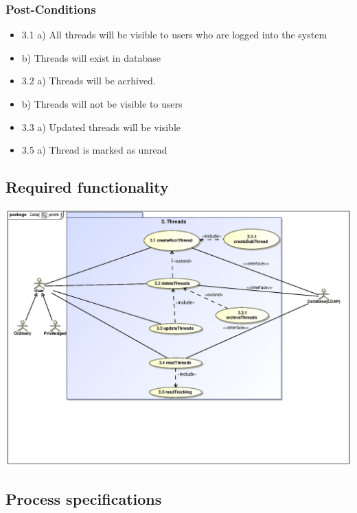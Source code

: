 \documentclass[hidelinks, 12pt, oneside]{article}
\begin{document}
\subsubsection{Post-Conditions}								%
\begin{itemize}
\item 3.1 a) All threads will be visible to users who are logged into the system
\item     b) Threads will exist in database
\item 3.2 a) Threads will be acrhived.
\item     b) Threads will not be visible to users
\item 3.3 a) Updated threads will be visible
\item 3.5 a) Thread is marked as unread
\end{itemize}

\subsection{Required functionality} 
\includegraphics[scale=.9]{Renaldo/useCaseThreads.eps}\\

\subsection{Process specifications}
\end{document}
